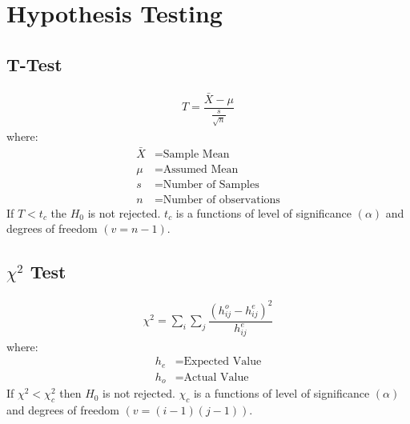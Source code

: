 \chapter{Hypothesis Testing}
\section{T-Test}
\begin{align}
	T = \dfrac{\bar{X}-\mu}{\frac{s}{\sqrt{n}}}
\end{align}
where:
\begin{align*}
	\bar{X} &= \text{Sample Mean}\\
	\mu &= \text{Assumed Mean}\\
	s &= \text{Number of Samples}\\
	n &= \text{Number of observations}
\end{align*}
If $T < t_c$ the $H_0$ is not rejected. $t_c$ is a functions of level of significance $(\alpha)$ and degrees of freedom $(v = n -1)$.


\section{$\chi^2$ Test}
\begin{align}
	\chi^2 = \sum_i \sum_j \dfrac{(h_{ij}^o-h_{ij}^e)^2}{h_{ij}^e}
\end{align}
where:
\begin{align*}
	h_e &= \text{Expected Value}\\
	h_o &= \text{Actual Value}
\end{align*}
If $\chi^2 < \chi_c^2$ then $H_0$ is not rejected. $\chi_c$ is a functions of level of significance $(\alpha)$ and degrees of freedom $(v = (i-1)(j-1))$.
